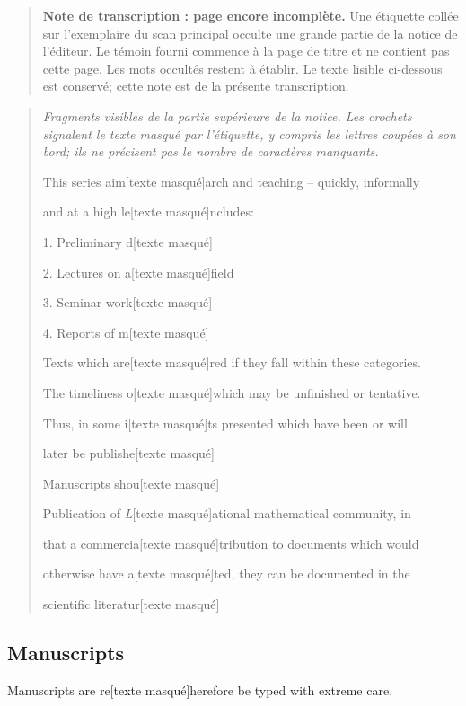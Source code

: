 \begin{quote}
\textbf{Note de transcription : page encore incomplète.}
Une étiquette collée sur l'exemplaire du scan principal occulte une grande
partie de la notice de l'éditeur. Le témoin fourni commence à la page de titre
et ne contient pas cette page. Les mots occultés restent à établir. Le texte
lisible ci-dessous est conservé; cette note est de la présente transcription.
\end{quote}

\begin{quote}
\textit{Fragments visibles de la partie supérieure de la notice. Les crochets
signalent le texte masqué par l'étiquette, y compris les lettres coupées à son
bord; ils ne précisent pas le nombre de caractères manquants.}
\begin{flushleft}
This series aim[texte masqué]arch and teaching -- quickly, informally\par
and at a high le[texte masqué]ncludes:\par
1. Preliminary d[texte masqué]\par
2. Lectures on a[texte masqué]field\par
3. Seminar work[texte masqué]\par
4. Reports of m[texte masqué]\par
Texts which are[texte masqué]red if they fall within these categories.\par
The timeliness o[texte masqué]which may be unfinished or tentative.\par
Thus, in some i[texte masqué]ts presented which have been or will\par
later be publishe[texte masqué]\par
Manuscripts shou[texte masqué]\par
Publication of \textit{L}[texte masqué]ational mathematical community, in\par
that a commercia[texte masqué]tribution to documents which would\par
otherwise have a[texte masqué]ted, they can be documented in the\par
scientific literatur[texte masqué]
\end{flushleft}
\end{quote}

\subsection*{Manuscripts}
Manuscripts are re[texte masqué]herefore be typed with extreme care.

